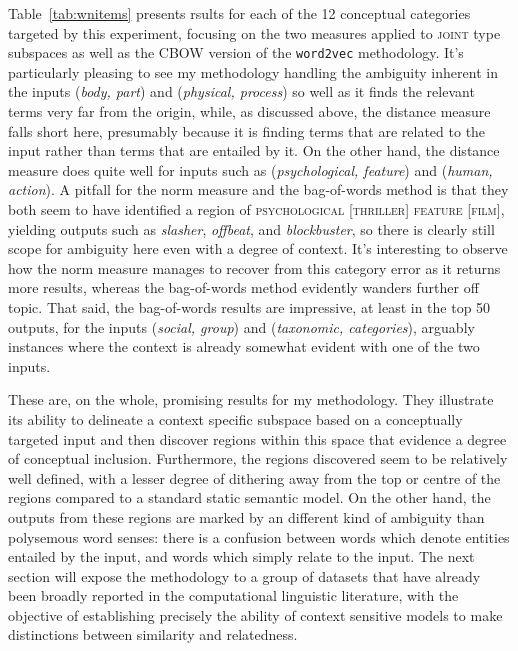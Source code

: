 Table~\ref{tab:wnitems} presents   rsults for each of the 12 conceptual categories targeted by this experiment, focusing on the two measures applied to \textsc{joint} type subspaces as well as the CBOW version of the \texttt{word2vec} methodology.  It's particularly pleasing to see my methodology handling the ambiguity inherent in the inputs (\emph{body, part}) and (\emph{physical, process}) so well as it finds the relevant terms very far from the origin, while, as discussed above, the distance measure falls short here, presumably because it is finding terms that are related to the input rather than terms that are entailed by it.  On the other hand, the distance measure does quite well for inputs such as (\emph{psychological, feature}) and (\emph{human, action}).  A pitfall for the norm measure and the bag-of-words method is that they both seem to have identified a region of \textsc{psychological [thriller] feature [film]}, yielding outputs such as \emph{slasher}, \emph{offbeat}, and \emph{blockbuster}, so there is clearly still scope for ambiguity here even with a degree of context.  It's interesting to observe how the norm measure manages to recover from this category error as it returns more results, whereas the bag-of-words method evidently wanders further off topic.  That said, the bag-of-words results are impressive, at least in the top 50 outputs, for the inputs (\emph{social, group}) and (\emph{taxonomic, categories}), arguably instances where the context is already somewhat evident with one of the two inputs.

These are, on the whole, promising results for my methodology.  They illustrate its ability to delineate a context specific subspace based on a conceptually targeted input and then discover regions within this space that evidence a degree of conceptual inclusion.  Furthermore, the regions discovered seem to be relatively well defined, with a lesser degree of dithering away from the top or centre of the regions compared to a standard static semantic model.  On the other hand, the outputs from these regions are marked by an different kind of ambiguity than polysemous word senses: there is a confusion between words which denote entities entailed by the input, and words which simply relate to the input.  The next section will expose the methodology to a group of datasets that have already been broadly reported in the computational linguistic literature, with the objective of establishing precisely the ability of context sensitive models to make distinctions between similarity and relatedness.

